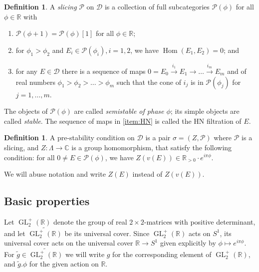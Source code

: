 \documentclass[leqno,11pt,twoside]{amsart}
\theoremstyle{definition}
\newtheorem{Def}[Thm]{Definition}
\begin{document}
\begin{Def} \label{def:slicing}
A \emph{slicing} ${\ensuremath{\mathcal P}}$ on ${\ensuremath{\mathcal D}}$ is a collection of full subcategories ${\ensuremath{\mathcal P}}(\phi)$ for all $\phi \in
{\ensuremath{\mathbb{R}}}$ with
\begin{enumerate}
\item ${\ensuremath{\mathcal P}}(\phi+1) = {\ensuremath{\mathcal P}}(\phi)[1]$ for all $\phi \in {\ensuremath{\mathbb{R}}}$;
\item for $\phi_1 > \phi_2$ and $E_i \in {\ensuremath{\mathcal P}}(\phi_i),  i = 1,2$, we have ${\mathop{\mathrm{Hom}}\nolimits}(E_1, E_2) = 0$; and
\item \label{item:HN} 
for any $E \in {\ensuremath{\mathcal D}}$ there is a sequence of maps
$ 0 = E_0 \xrightarrow{i_1} E_1 \to \dots \xrightarrow{i_m} E_m$
and of real numbers $\phi_1 > \phi_2 > \dots > \phi_m$
such that the cone of $i_j$ is in ${\ensuremath{\mathcal P}}(\phi_j)$
for $j = 1, \dots, m$.
\end{enumerate}
\end{Def}
The objects of ${\ensuremath{\mathcal P}}(\phi)$ are called \emph{semistable of phase $\phi$}; its 
simple objects are called \emph{stable}. The sequence of maps in \eqref{item:HN} is called the HN
filtration of $E$.

\begin{Def} \label{def:prestability}
A pre-stability condition on ${\ensuremath{\mathcal D}}$ is a pair $\sigma = (Z, {\ensuremath{\mathcal P}})$ where ${\ensuremath{\mathcal P}}$ is a slicing, and
$Z \colon \Lambda \to {\ensuremath{\mathbb{C}}}$ is a group homomorphism, that satisfy the following condition:
for all $0 \neq E \in {\ensuremath{\mathcal P}}(\phi)$, we have $Z(v(E)) \in {\ensuremath{\mathbb{R}}}_{>0}\cdot e^{i \pi \phi}$.
\end{Def}
We will abuse notation and write $Z(E)$ instead of $Z(v(E))$.

\subsection*{Basic properties}
Let ${\mathop{\mathrm{GL}}\nolimits}_2^+({\ensuremath{\mathbb{R}}})$ denote the group of real $2 \times 2$-matrices with positive determinant, and
let ${\widetilde{{\mathop{\mathrm{GL}}\nolimits}_2^+({\ensuremath{\mathbb{R}}})}}$ be its universal cover. Since ${\mathop{\mathrm{GL}}\nolimits}_2^+({\ensuremath{\mathbb{R}}})$ acts on $S^1$, its universal
cover  acts on the universal cover ${\ensuremath{\mathbb{R}}} \to S^1$ given explicitly by $\phi \mapsto e^{i\pi\phi}$.
For $\tilde g \in {\widetilde{{\mathop{\mathrm{GL}}\nolimits}_2^+({\ensuremath{\mathbb{R}}})}}$ we will write $g$  for the corresponding element of ${\mathop{\mathrm{GL}}\nolimits}_2^+({\ensuremath{\mathbb{R}}})$, and
$\tilde g.\phi$ for the given action on ${\ensuremath{\mathbb{R}}}$.
\end{document}
